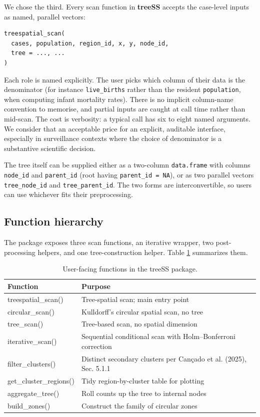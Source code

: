 We chose the third. Every scan function in \textbf{treeSS} accepts the
case-level inputs as named, parallel vectors:

\begin{verbatim}
treespatial_scan(
  cases, population, region_id, x, y, node_id,
  tree = ..., ...
)
\end{verbatim}

Each role is named explicitly. The user picks which column of their data is
the denominator (for instance \texttt{live\_births} rather than the resident
\texttt{population}, when computing infant mortality rates). There is no implicit
column-name convention to memorise, and partial inputs are caught at call
time rather than mid-scan. The cost is verbosity: a typical call has six
to eight named arguments. We consider that an acceptable price for an
explicit, auditable interface, especially in surveillance contexts where
the choice of denominator is a substantive scientific decision.

The tree itself can be supplied either as a two-column \texttt{data.frame} with
columns \texttt{node\_id} and \texttt{parent\_id} (root having \texttt{parent\_id\ =\ NA}), or as
two parallel vectors \texttt{tree\_node\_id} and \texttt{tree\_parent\_id}. The two forms
are interconvertible, so users can use whichever fits their preprocessing.

\hypertarget{function-hierarchy}{%
\subsection{Function hierarchy}\label{function-hierarchy}}

The package exposes three scan functions, an iterative wrapper, two
post-processing helpers, and one tree-construction helper. Table
\ref{tab:functions} summarizes them.

\begin{table}

\caption{\label{tab:functions}User-facing functions in the treeSS package.}
\centering
\begin{tabular}[t]{ll}
\toprule
Function & Purpose\\
\midrule
treespatial\_scan() & Tree-spatial scan; main entry point\\
circular\_scan() & Kulldorff's circular spatial scan, no tree\\
tree\_scan() & Tree-based scan, no spatial dimension\\
iterative\_scan() & Sequential conditional scan with Holm--Bonferroni correction\\
filter\_clusters() & Distinct secondary clusters per Cançado et al. (2025), Sec. 5.1.1\\
\addlinespace
get\_cluster\_regions() & Tidy region-by-cluster table for plotting\\
aggregate\_tree() & Roll counts up the tree to internal nodes\\
build\_zones() & Construct the family of circular zones\\
\bottomrule
\end{tabular}
\end{table}

